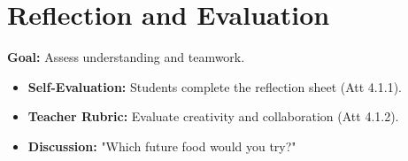 \documentclass[11pt, a4paper]{article}
\begin{document}
\section{Reflection and Evaluation}
\textbf{Goal:} Assess understanding and teamwork.
\begin{itemize}
    \item \textbf{Self-Evaluation:} Students complete the reflection sheet (Att 4.1.1).
    \item \textbf{Teacher Rubric:} Evaluate creativity and collaboration (Att 4.1.2).
    \item \textbf{Discussion:} "Which future food would you try?"
\end{itemize}
\end{document}
